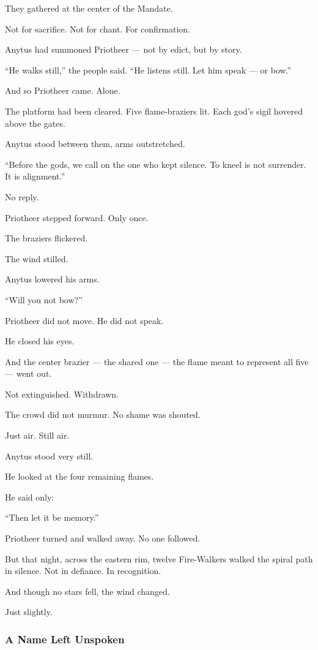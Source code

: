 \documentclass[12pt]{article}
\begin{document}
They gathered at the center of the Mandate.

Not for sacrifice.  
Not for chant.  
For confirmation.

Anytus had summoned Priotheer — not by edict,  
but by story.

 “He walks still,” the people said.  
 “He listens still.  
 Let him speak — or bow.”

And so Priotheer came.  
Alone.

The platform had been cleared.  
Five flame-braziers lit.  
Each god’s sigil hovered above the gates.

Anytus stood between them, arms outstretched.

 “Before the gods, we call on the one who kept silence.  
 To kneel is not surrender.  
It is alignment.”

No reply.

Priotheer stepped forward.  
Only once.

The braziers flickered.

The wind stilled.

Anytus lowered his arms.

 “Will you not bow?”

Priotheer did not move.  
He did not speak.

He closed his eyes.

And the center brazier — the shared one —  
the flame meant to represent all five —  
went out.

Not extinguished.  
Withdrawn.

The crowd did not murmur.  
No shame was shouted.

Just air.  
Still air.

Anytus stood very still.

He looked at the four remaining flames.

He said only:

 “Then let it be memory.”

Priotheer turned and walked away.  
No one followed.

But that night, across the eastern rim,  
twelve Fire-Walkers walked the spiral path in silence.  
Not in defiance.  
In recognition.

And though no stars fell,  
the wind changed.

Just slightly.

\dotfill

\subsubsection*{A Name Left Unspoken}
\end{document}
